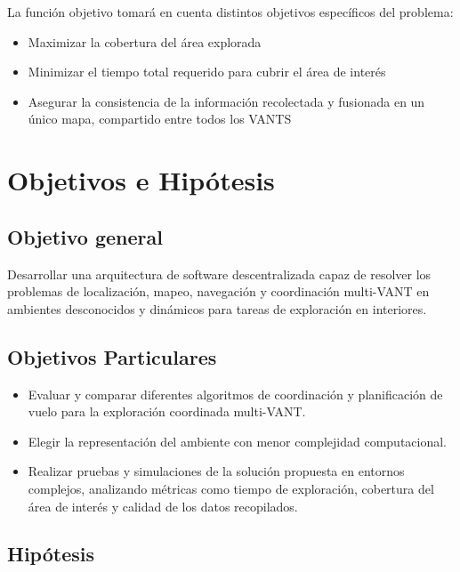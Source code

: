 \documentclass[sigconf]{acmart}
\begin{document}
La funci\'{o}n objetivo tomar\'{a} en cuenta distintos objetivos espec\'{i}ficos del problema:
\begin{itemize}
\item Maximizar la cobertura del \'{a}rea explorada 
\item Minimizar el tiempo total requerido para cubrir el \'{a}rea de inter\'{e}s
\item Asegurar la consistencia de la información recolectada y fusionada en un único mapa, compartido entre todos los VANTS
\end{itemize}

\section{Objetivos e Hipótesis}

\subsection*{Objetivo general}

Desarrollar una arquitectura de software descentralizada capaz de resolver los problemas de localización, mapeo, navegación y coordinación multi-VANT en ambientes desconocidos y dinámicos para tareas de exploración en interiores.

\subsection*{Objetivos Particulares}

\begin{itemize}
\item Evaluar y comparar diferentes algoritmos de coordinación y planiﬁcación de vuelo para la exploración coordinada multi-VANT.
\item Elegir la representación del ambiente con menor complejidad computacional.
\item Realizar pruebas y simulaciones de la solución propuesta en entornos complejos, analizando métricas como tiempo de exploración, cobertura del área de interés y calidad de los datos recopilados.
\end{itemize}

\subsection*{Hipótesis}
\end{document}
